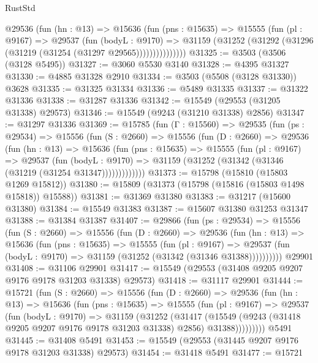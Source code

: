 \begin{lexlean}{RustStd}
\begin{coremodule}
            @29536
              (fun (hn : @13) =>
              @15636
                (fun (pns : @15635) =>
                @15555
                  (fun (pl : @9167) =>
                  @29537
                    (fun (bodyL : @9170) =>
                    @31159 (@31252 (@31292 (@31296 (@31219 (@31254 (@31297 @29565)))))))))))))))
@31325 := @3503 (@3506 (@3128 @5495))
@31327 := @3060 @5530 @3140
@31328 := @4395 @31327
@31330 := @4885 @31328 @2910
@31334 := @3503 (@5508 (@3128 @31330)) @3628
@31335 := @31325 @31334
@31336 := @5489 @31335
@31337 := @31322 @31336
@31338 := @31287 @31336
@31342 := @15549 (@29553 (@31205 @31338) @29573)
@31346 := @15549 (@9243 (@31210 @31338) @2856)
@31347 := @31297 @31336
@31369 := @15785
    (fun (Γ : @15560) =>
    @29535
      (fun (ps : @29534) =>
      @15556
        (fun (S : @2660) =>
        @15556
          (fun (D : @2660) =>
          @29536
            (fun (hn : @13) =>
            @15636
              (fun (pns : @15635) =>
              @15555
                (fun (pl : @9167) =>
                @29537
                  (fun (bodyL : @9170) =>
                  @31159 (@31252 (@31342 (@31346 (@31219 (@31254 @31347)))))))))))))
@31373 := @15798 (@15810 (@15803 @1269 @15812))
@31380 := @15809 (@31373 (@15798 (@15816 (@15803 @1498 @15818)) @15588))
@31381 := @31369 @31380
@31383 := @31217 (@15600 @31380)
@31384 := @15549 @31383
@31387 := @15607 @31380 @31253 @31347
@31388 := @31384 @31387
@31407 := @29866
    (fun (ps : @29534) =>
    @15556
      (fun (S : @2660) =>
      @15556
        (fun (D : @2660) =>
        @29536
          (fun (hn : @13) =>
          @15636
            (fun (pns : @15635) =>
            @15555
              (fun (pl : @9167) =>
              @29537 (fun (bodyL : @9170) => @31159 (@31252 (@31342 (@31346 @31388))))))))))
    @29901
@31408 := @31106 @29901
@31417 := @15549 (@29553 (@31408 @9205 @9207 @9176 @9178 @31203 @31338) @29573)
@31418 := @31117 @29901
@31444 := @15721
    (fun (S : @2660) =>
    @15556
      (fun (D : @2660) =>
      @29536
        (fun (hn : @13) =>
        @15636
          (fun (pns : @15635) =>
          @15555
            (fun (pl : @9167) =>
            @29537
              (fun (bodyL : @9170) =>
              @31159
                (@31252
                  (@31417
                    (@15549
                      (@9243 (@31418 @9205 @9207 @9176 @9178 @31203 @31338) @2856)
                      @31388)))))))))
    @5491
@31445 := @31408 @5491
@31453 := @15549 (@29553 (@31445 @9207 @9176 @9178 @31203 @31338) @29573)
@31454 := @31418 @5491
@31477 := @15721

\end{coremodule}
\end{lexlean}

